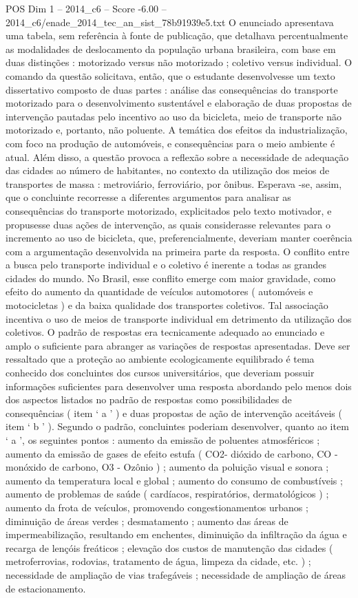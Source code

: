 \begin{textsample}{POS Dim 1 – 2014\_c6 – Score -6.00 – 2014\_c6/enade\_2014\_tec\_an\_sist\_78b91939e5.txt}
O enunciado apresentava uma tabela, sem referência à fonte de publicação, que detalhava percentualmente as modalidades de deslocamento da população urbana brasileira, com base em duas distinções : motorizado versus não motorizado ; coletivo versus individual.
O comando da questão solicitava, então, que o estudante desenvolvesse um texto dissertativo composto de duas partes : análise das consequências do transporte motorizado para o desenvolvimento sustentável e elaboração de duas propostas de intervenção pautadas pelo incentivo ao uso da bicicleta, meio de transporte não motorizado e, portanto, não poluente.
A temática dos efeitos da industrialização, com foco na produção de automóveis, e consequências para o meio ambiente é atual.
Além disso, a questão provoca a reflexão sobre a necessidade de adequação das cidades ao número de habitantes, no contexto da utilização dos meios de transportes de massa : metroviário, ferroviário, por ônibus.
Esperava -se, assim, que o concluinte recorresse a diferentes argumentos para analisar as consequências do transporte motorizado, explicitados pelo texto motivador, e propusesse duas ações de intervenção, as quais considerasse relevantes para o incremento ao uso de bicicleta, que, preferencialmente, deveriam manter coerência com a argumentação desenvolvida na primeira parte da resposta.
O conflito entre a busca pelo transporte individual e o coletivo é inerente a todas as grandes cidades do mundo.
No Brasil, esse conflito emerge com maior gravidade, como efeito do aumento da quantidade de veículos automotores ( automóveis e motocicletas ) e da baixa qualidade dos transportes coletivos.
Tal associação incentiva o uso de meios de transporte individual em detrimento da utilização dos coletivos.
O padrão de respostas era tecnicamente adequado ao enunciado e amplo o suficiente para abranger as variações de respostas apresentadas.
Deve ser ressaltado que a proteção ao ambiente ecologicamente equilibrado é tema conhecido dos concluintes dos cursos universitários, que deveriam possuir informações suficientes para desenvolver uma resposta abordando pelo menos dois dos aspectos listados no padrão de respostas como possibilidades de consequências ( item ‘ a ’ ) e duas propostas de ação de intervenção aceitáveis ( item ‘ b ’ ).
Segundo o padrão, concluintes poderiam desenvolver, quanto ao item ‘ a ’, os seguintes pontos : aumento da emissão de poluentes atmosféricos ; aumento da emissão de gases de efeito estufa ( CO2- dióxido de carbono, CO - monóxido de carbono, O3 - Ozônio ) ; aumento da poluição visual e sonora ; aumento da temperatura local e global ; aumento do consumo de combustíveis ; aumento de problemas de saúde ( cardíacos, respiratórios, dermatológicos ) ; aumento da frota de veículos, promovendo congestionamentos urbanos ; diminuição de áreas verdes ; desmatamento ; aumento das áreas de impermeabilização, resultando em enchentes, diminuição da infiltração da água e recarga de lençóis freáticos ; elevação dos custos de manutenção das cidades ( metroferrovias, rodovias, tratamento de água, limpeza da cidade, etc. ) ; necessidade de ampliação de vias trafegáveis ; necessidade de ampliação de áreas de estacionamento.

\end{textsample}
